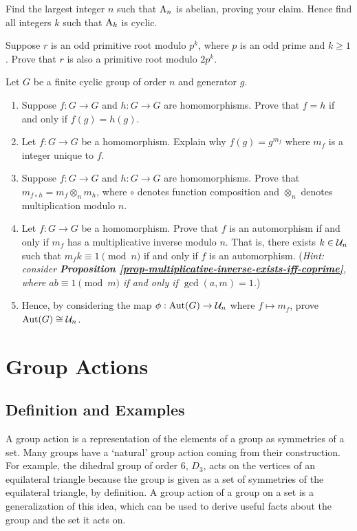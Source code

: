 \begin{problem}
    Find the largest integer $n$ such that $\mathrm{A}_{n}$ is abelian, proving your claim. Hence find all integers $k$ such that $\mathrm{A}_{k}$ is cyclic.
\end{problem}

\begin{problem}
    Suppose $r$ is an odd primitive root modulo $p^k$, where $p$ is an odd prime and $k \geq 1$. Prove that $r$ is also a primitive root modulo $2p^k$.
\end{problem}

\begin{problem}
    Let $G$ be a finite cyclic group of order $n$ and generator $g$.
    \begin{enumerate}[label=(\roman*)]
        \item Suppose $f: G \to G$ and $h: G \to G$ are homomorphisms. Prove that $f = h$ if and only if $f(g) = h(g)$.
        \item Let $f: G \to G$ be a homomorphism. Explain why $f(g) = g^{m_f}$ where $m_f$ is a integer unique to $f$.
        \item Suppose $f: G \to G$ and $h: G \to G$ are homomorphisms. Prove that $m_{f\circ h} = m_f \otimes_n m_h$, where $\circ$ denotes function composition and $\otimes_n$ denotes multiplication modulo $n$.
        \item Let $f: G \to G$ be a homomorphism. Prove that $f$ is an automorphism if and only if $m_f$ has a multiplicative inverse modulo $n$. That is, there exists $k \in \mathcal{U}_{n}$ such that $m_fk \equiv 1 \pmod n$ if and only if $f$ is an automorphism.\newline
        (\textit{Hint: consider \textbf{Proposition \ref{prop-multiplicative-inverse-exists-iff-coprime}}, where $ab \equiv 1 \pmod m$ if and only if $\gcd(a, m) = 1$.})
        \item Hence, by considering the map $\phi: \mathrm{Aut}(G) \to \mathcal{U}_{n}$ where $f \mapsto m_f$, prove $\mathrm{Aut}(G) \cong \mathcal{U}_{n}$. 
    \end{enumerate}
\end{problem}

\chapter{Group Actions}
\section{Definition and Examples}
A group action is a representation of the elements of a group as symmetries of a set. Many groups have a `natural' group action coming from their construction. For example, the dihedral group of order 6, $D_3$, acts on the vertices of an equilateral triangle because the group is given as a set of symmetries of the equilateral triangle, by definition. A group action of a group on a set is a generalization of this idea, which can be used to derive useful facts about the group and the set it acts on.

